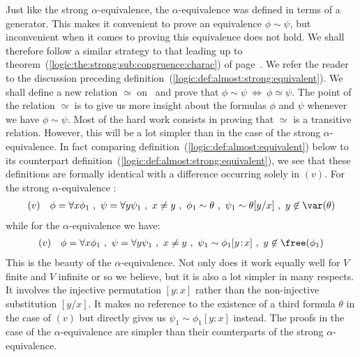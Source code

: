Just like the strong $\alpha$-equivalence, the $\alpha$-equivalence 
was defined in terms of a generator. This makes it
convenient to prove an equivalence $\phi\sim\psi$, but inconvenient
when it comes to proving this equivalence does not hold. We shall
therefore follow a similar strategy to that leading up to
theorem~(\ref{logic:the:strong:sub:congruence:charac}) of
page~\pageref{logic:the:strong:sub:congruence:charac}. We refer the
reader to the discussion preceding
definition~(\ref{logic:def:almost:strong:equivalent}). We shall
define a new relation $\simeq$ on \pv\ and prove that $\phi\sim\psi\
\Leftrightarrow\ \phi\simeq\psi$. The point of the relation $\simeq$
is to give us more insight about the formulas $\phi$ and $\psi$
whenever we have $\phi\sim\psi$. Most of the hard work consists in
proving that $\simeq$ is a transitive relation. However, this will
be a lot simpler than in the case of the strong $\alpha$-equivalence. 
In fact comparing
definition~(\ref{logic:def:almost:equivalent}) below to its
counterpart definition~(\ref{logic:def:almost:strong:equivalent}),
we see that these definitions are formally identical with a
difference occurring solely in $(v)$. 
For the strong $\alpha$-equivalence :
    \begin{eqnarray*}
    (v)&&\phi=\forall x\phi_{1}\ ,\ \psi=\forall y\psi_{1}\ ,\ x\neq y\ ,\
    \phi_{1}\sim \theta\ ,\ \psi_{1}\sim \theta[y/x]\ ,\ y\not\in\var(\theta)
    \end{eqnarray*}
while for the $\alpha$-equivalence we have:
    \begin{eqnarray*}
    (v)&&\phi=\forall x\phi_{1}\ ,\ \psi=\forall y\psi_{1}\ ,\ x\neq y\ ,\
    \psi_{1}\sim \phi_{1}[y\!:\!x]\ ,\ y\not\in\free(\phi_{1})
    \end{eqnarray*}
This is the beauty of the $\alpha$-equivalence. Not only does it
work equally well for $V$ finite and $V$ infinite or so we believe,
but it is also a lot simpler in many respects. It involves the
injective permutation $[y\!:\!x]$ rather than the non-injective
substitution $[y/x]$. It makes no reference to the existence of a
third formula $\theta$ in the case of $(v)$ but directly gives us
$\psi_{1}\sim \phi_{1}[y\!:\!x]$ instead. The proofs in the case of
the $\alpha$-equivalence are simpler than their counterparts of
the strong $\alpha$-equivalence.

